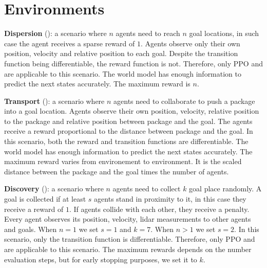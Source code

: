 \section{Environments}\label{apx:scenarios}

\begin{compactitem}
    \item \textbf{Dispersion} (): 
         a scenario where $n$ agents need to reach $n$ goal locations, in such case the agent receives a sparse reward of $1$. Agents observe only their own position, velocity and relative position to each goal. 
         Despite the transition function being differentiable, the reward function is not. Therefore, only PPO and \fname{} are applicable to this scenario. 
         The world model has enough information to predict the next states accurately.
         The maximum reward is $n$.
    \item \textbf{Transport} (): 
         a scenario where $n$ agents need to collaborate to push a package into a goal location. Agents observe their own position, velocity, relative position to the package and relative position between package and the goal. The agents receive a reward proportional to the distance between package and the goal. 
         In this scenario, both the reward and transition functions are differentiable. 
         The world model has enough information to predict the next states accurately.
         The maximum reward varies from environement to environment. It is the scaled distance between the package and the goal times the number of agents.
    \item \textbf{Discovery} (): 
         a scenario where $n$ agents need to collect $k$ goal place randomly. A goal is collected if at least $s$ agents stand in proximity to it, in this case they receive a reward of $1$. If agents collide with each other, they receive a penalty. Every agent observes its position, velocity, lidar measurements to other agents and goals. When $n=1$ we set $s=1$ and $k=7$. When $n>1$ we set $s=2$.
         In this scenario, only the transition function is differentiable. Therefore, only PPO and \fname{} are applicable to this scenario. 
         The maximum rewards depends on the number evaluation steps, but for early stopping purposes, we set it to $k$. 

\end{compactitem}
